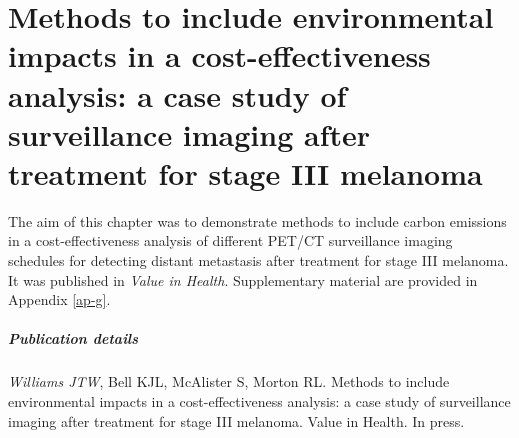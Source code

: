 \chapter{Methods to include environmental impacts in a cost-effectiveness analysis: a case study of surveillance imaging after treatment for stage III melanoma}
\label{ch-7}

The aim of this chapter was to demonstrate methods to include carbon emissions in a cost-effectiveness analysis of different PET/CT surveillance imaging schedules for detecting distant metastasis after treatment for stage III melanoma. It was published in \textit{Value in Health}. Supplementary material are provided in Appendix \ref{ap-g}.

\paragraph*{Publication details}
\textit{Williams JTW}, Bell KJL, McAlister S, Morton RL. Methods to include environmental impacts in a cost-effectiveness analysis: a case study of surveillance imaging after treatment for stage III melanoma. Value in Health. In press.
















